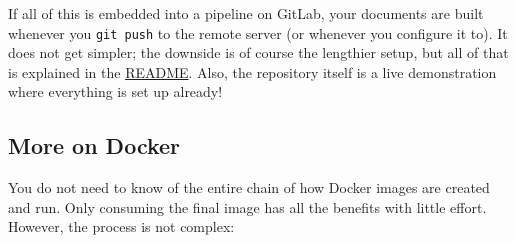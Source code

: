 If all of this is embedded into a pipeline on GitLab, your documents are built whenever
you \texttt{git push} to the remote server (or whenever you configure it to).
It does not get simpler; the downside is of course the lengthier setup, but all of that
is explained in the
\href{https://collaborating.tuhh.de/alex/latex-git-cookbook/-/blob/master/README.md}{README}.
Also, the repository itself is a live demonstration where everything is set up already!

\subsection{More on Docker}

You do not need to know of the entire chain of how Docker images are created and run.
Only consuming the final image has all the benefits with little effort.
However, the process is not complex:
